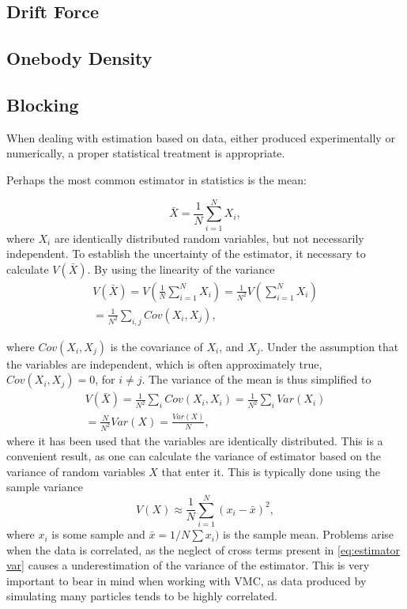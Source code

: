 \subsection{Drift Force}
\subsection{Onebody Density}

\subsection{Blocking}
When dealing with estimation based on data, either produced experimentally or numerically, a proper statistical treatment is appropriate. 

Perhaps the most common estimator in statistics is the mean:

\begin{equation}
	\label{eq:mean}
	\bar{X} = \frac{1}{N}\sum_{i=1}^{N}{X_i},
\end{equation}
where $X_i$ are identically distributed random variables, but not necessarily independent. To establish the uncertainty of the estimator, it necessary to calculate $V(\bar{X})$. By using the linearity of the variance
\begin{equation}
\label{eq:estimator var}
\begin{split}
	V(\bar{X}) = V(\frac{1}{N}\sum_{i=1}^{N}{X_i}) = \frac{1}{N^2}V(\sum_{i=1}^{N}{X_i})\\
	=\frac{1}{N^2}\sum_{i,j}{Cov(X_i, X_j)},
\end{split}
\end{equation}

where $Cov(X_i, X_j)$ is the covariance of $X_i$, and $X_j$. Under the assumption that the variables are independent, which is often approximately true, $Cov(X_i, X_j) = 0$, for $i \neq j$. The variance of the mean is thus simplified to 
\begin{equation*}
\begin{split}
	V(\bar{X}) = \frac{1}{N^2}\sum_{i}{Cov(X_i, X_i)} = \frac{1}{N^2}\sum_{i}{Var(X_i)} \\
	=\frac{N}{N^2}Var(X) = \frac{Var(X)}{N},
\end{split}
\end{equation*} 
where it has been used that the variables are identically distributed. This is a convenient result, as one can calculate the variance of estimator based on the variance of random variables $X$ that enter it. This is typically done using the sample variance
\begin{equation*}
	V(X) \approx \frac{1}{N}\sum_{i=1}^{N}{(x_i - \bar{x})^2},
\end{equation*}
where $x_i$ is some sample and $\bar{x} = 1/N\sum{x_i)}$ is the sample mean. Problems arise when the data is correlated, as the neglect of cross terms present in \autoref{eq:estimator var} causes a underestimation of the variance of the estimator. This is very important to bear in mind when working with VMC, as data produced by simulating many particles tends to be highly correlated.

